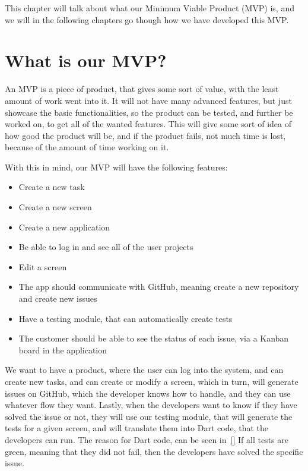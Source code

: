 This chapter will talk about what our Minimum Viable Product (MVP) is, and we will in the following chapters go though how we have developed this MVP.

\section{What is our MVP?}
An MVP is a piece of product, that gives some sort of value, with the least amount of work went into it.
It will not have many advanced features, but just showcase the basic functionalities, so the product can be tested, and further be worked on, to get all of the wanted features.
This will give some sort of idea of how good the product will be, and if the product fails, not much time is lost, because of the amount of time working on it. \cite{whatIsMVP}

With this in mind, our MVP will have the following features:

\begin{itemize}
    \item Create a new task
    \item Create a new screen
    \item Create a new application
    \item Be able to log in and see all of the user projects
    \item Edit a screen 
    \item The app should communicate with GitHub, meaning create a new repository and create new issues
    \item Have a testing module, that can automatically create tests
    \item The customer should be able to see the status of each issue, via a Kanban board in the application
\end{itemize}

We want to have a product, where the user can log into the system, and can create new tasks, and can create or modify a screen, which in turn, will generate issues on GitHub, which the developer knows how to handle, and they can use whatever flow they want.
Lastly, when the developers want to know if they have solved the issue or not, they will use our testing module, that will generate the tests for a given screen, and will translate them into Dart code, that the developers can run. The reason for Dart code, can be seen in~\autoref{} 
If all tests are green, meaning that they did not fail, then the developers have solved the specific issue.